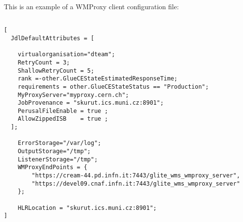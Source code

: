 This is an example of a WMProxy client configuration file:
\label{cliconfex}
\begin{verbatim}

[
  JdlDefaultAttributes = [
	
    virtualorganisation="dteam";
    RetryCount = 3;
    ShallowRetryCount = 5;
    rank =-other.GlueCEStateEstimatedResponseTime;
    requirements = other.GlueCEStateStatus == "Production";
    MyProxyServer="myproxy.cern.ch";
    JobProvenance = "skurut.ics.muni.cz:8901";
    PerusalFileEnable = true ;
    AllowZippedISB    = true ;
  ];
        
    ErrorStorage="/var/log";
    OutputStorage="/tmp";
    ListenerStorage="/tmp";
    WMProxyEndPoints = {
        "https://cream-44.pd.infn.it:7443/glite_wms_wmproxy_server",
        "https://devel09.cnaf.infn.it:7443/glite_wms_wmproxy_server"
    };

    HLRLocation = "skurut.ics.muni.cz:8901";
]


\end{verbatim}
